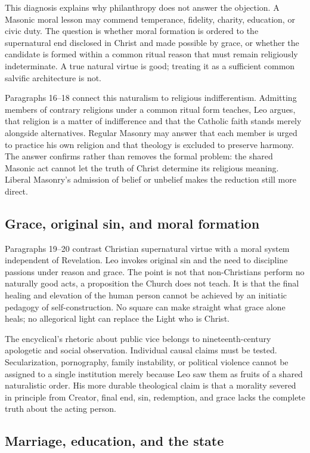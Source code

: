 This diagnosis explains why philanthropy does not answer the objection. A Masonic moral lesson may commend temperance, fidelity, charity, education, or civic duty. The question is whether moral formation is ordered to the supernatural end disclosed in Christ and made possible by grace, or whether the candidate is formed within a common ritual reason that must remain religiously indeterminate. A true natural virtue is good; treating it as a sufficient common salvific architecture is not.

Paragraphs 16--18 connect this naturalism to religious indifferentism. Admitting members of contrary religions under a common ritual form teaches, Leo argues, that religion is a matter of indifference and that the Catholic faith stands merely alongside alternatives. Regular Masonry may answer that each member is urged to practice his own religion and that theology is excluded to preserve harmony. The answer confirms rather than removes the formal problem: the shared Masonic act cannot let the truth of Christ determine its religious meaning. Liberal Masonry's admission of belief or unbelief makes the reduction still more direct.

\subsection{Grace, original sin, and moral formation}

Paragraphs 19--20 contrast Christian supernatural virtue with a moral system independent of Revelation. Leo invokes original sin and the need to discipline passions under reason and grace. The point is not that non-Christians perform no naturally good acts, a proposition the Church does not teach. It is that the final healing and elevation of the human person cannot be achieved by an initiatic pedagogy of self-construction. No square can make straight what grace alone heals; no allegorical light can replace the Light who is Christ.

The encyclical's rhetoric about public vice belongs to nineteenth-century apologetic and social observation. Individual causal claims must be tested. Secularization, pornography, family instability, or political violence cannot be assigned to a single institution merely because Leo saw them as fruits of a shared naturalistic order. His more durable theological claim is that a morality severed in principle from Creator, final end, sin, redemption, and grace lacks the complete truth about the acting person.

\subsection{Marriage, education, and the state}

